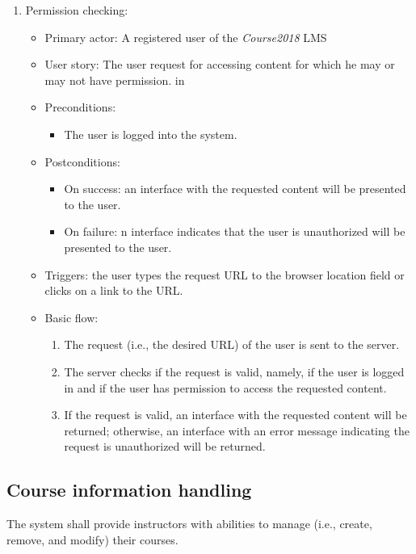 \begin{enumerate}
\item Permission checking:
\begin{itemize}
\item Primary actor: 
    A registered user of the \emph{Course2018} LMS
\item User story:
    The user request for accessing content for which he may or may not have
    permission.
 in
\item Preconditions:
    \begin{itemize}
        \item The user is logged into the system.
    \end{itemize}
\item Postconditions:
    \begin{itemize}
        \item On success: an interface with the requested content will be presented
            to the user.
        \item On failure: n interface indicates that the user is unauthorized will
            be presented to the user.
    \end{itemize}
\item Triggers: the user types the request URL to the browser location field
    or clicks on a link to the URL.
\item Basic flow:
    \begin{enumerate}
        \item The request (i.e., the desired URL) of the user is sent to the server.
        \item The server checks if the request is valid, namely, if the user
            is logged in and if the user has permission to access the requested
            content.
        \item If the request is valid, an interface with the requested content will
            be returned; otherwise, an interface with an error message 
            indicating the request is unauthorized will be returned.
    \end{enumerate}
\end{itemize}

\end{enumerate}


\subsection{Course information handling}
The system shall provide instructors with abilities to manage (i.e., create, remove,
and modify) their courses.
